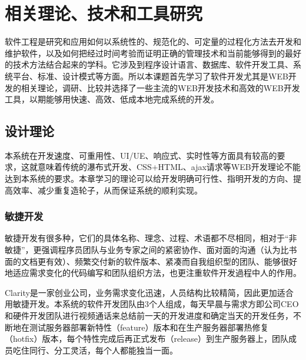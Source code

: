 
\chapter{相关理论、技术和工具研究}
\label{chap:web_dev}
软件工程是研究和应用如何以系统性的、规范化的、可定量的过程化方法去开发和维护软件\supercite{radatz1990ieee}，以及如何把经过时间考验而证明正确的管理技术和当前能够得到的最好的技术方法结合起来的学科。它涉及到程序设计语言、数据库、软件开发工具、系统平台、标准、设计模式等方面。所以本课题首先学习了软件开发尤其是WEB开发的相关理论，调研、比较并选择了一些主流的WEB开发技术和高效的WEB开发工具，以期能够用快速、高效、低成本地完成系统的开发。
\section{设计理论}
本系统在开发速度、可重用性、UI/UE、响应式、实时性等方面具有较高的要求，这就意味着传统的瀑布式开发、CSS+HTML、ajax请求等WEB开发理论不能达到本系统的要求。本章学习的理论可以给开发明确可行性、指明开发的方向、提高效率、减少重复造轮子，从而保证系统的顺利实现。
\subsection{敏捷开发}
敏捷开发有很多种，它们的具体名称、理念、过程、术语都不尽相同，相对于“非敏捷”，更强调程序员团队与业务专家之间的紧密协作、面对面的沟通（认为比书面的文档更有效）、频繁交付新的软件版本、紧凑而自我组织型的团队、能够很好地适应需求变化的代码编写和团队组织方法，也更注重软件开发過程中人的作用。\supercite{beck2013agile}

Clarity是一家创业公司，业务需求变化迅速，人员结构比较精简，因此更加适合用敏捷开发。本系统的软件开发团队由3个人组成，每天早晨与需求方即公司CEO和硬件开发团队进行视频通话来总结前一天的开发进度和确定当天的开发任务，不断地在测试服务器部署新特性（feature）版本和在生产服务器部署热修复（hotfix）版本，每个特性完成后再正式发布（release）到生产服务器上，团队成员吃住同行、分工灵活，每个人都能独当一面。

